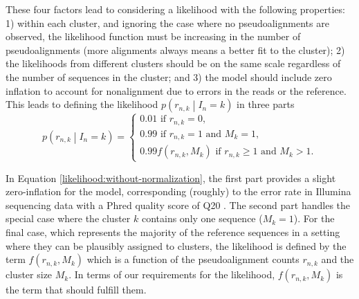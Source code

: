 \documentclass[officiallayout]{tktla}
\begin{document}
These four factors lead to considering a likelihood with the following
properties: 1) within each cluster, and ignoring the case where no
pseudoalignments are observed, the likelihood function must be
increasing in the number of pseudoalignments (more alignments always
means a better fit to the cluster); 2) the likelihoods from different
clusters should be on the same scale regardless of the number of
sequences in the cluster; and 3) the model should include zero
inflation to account for nonalignment due to errors in the reads or
the reference. This leads to defining the likelihood $p\left(r_{n,
  k} \middle| I_{n} = k\right)$ in three parts
\begin{equation}
  \label{likelihood:without-normalization}
  p\left(r_{n, k} \middle| I_{n} = k\right) =
  \begin{cases}
    0.01\text{ if } r_{n, k} = 0, \\
    0.99\text{ if } r_{n, k} = 1 \text{ and } M_{k} = 1, \\
    0.99f\left(r_{n, k}, M_{k}\right)\text{ if } r_{n, k} \geq 1\text{ and } M_{k} > 1.
  \end{cases}
\end{equation}

In Equation \eqref{likelihood:without-normalization}, the first part
provides a slight zero-inflation for the model, corresponding
(roughly) to the error rate in Illumina sequencing data with a Phred
quality score of Q20 \citep{ewing1998baseone, ewing1998basetwo}. The
second part handles the special case where the cluster $k$ contains
only one sequence ($M_{k} = 1$). For the final case, which represents
the majority of the reference sequences in a setting where they can be
plausibly assigned to clusters, the likelihood is defined by
the term $f\left(r_{n, k}, M_{k}\right)$ which is a function of the
pseudoalignment counts $r_{n, k}$ and the cluster size $M_{k}$. In
terms of our requirements for the likelihood, $f\left(r_{n, k},
M_{k}\right)$ is the term that should fulfill them.
\end{document}

